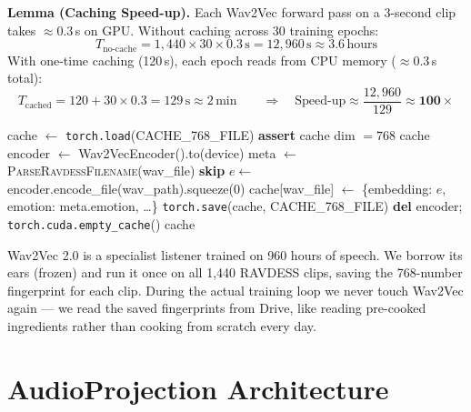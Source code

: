 \documentclass[12pt,a4paper]{article}
\theoremstyle{definition}
\theoremstyle{plain}
\theoremstyle{remark}
\begin{document}
\textbf{Lemma (Caching Speed-up).}
\label{lem:cache}
Each Wav2Vec forward pass on a 3-second clip takes $\approx 0.3$\,s on GPU.
Without caching across 30 training epochs:
\[
  T_{\text{no-cache}} = 1{,}440 \times 30 \times 0.3\,\text{s}
  = 12{,}960\,\text{s} \approx 3.6\,\text{hours}
\]
With one-time caching (120\,s), each epoch reads from CPU memory ($\approx 0.3$\,s total):
\[
  T_{\text{cached}} = 120 + 30 \times 0.3 = 129\,\text{s} \approx 2\,\text{min}
  \qquad \Rightarrow\quad \text{Speed-up} \approx \frac{12{,}960}{129} \approx \mathbf{100\times}
\]

\begin{algorithm}[H]
\caption{Extract and Cache RAVDESS Embeddings at 768d}
\label{alg:cache}
\begin{algorithmic}[1]
  \State cache $\gets$ \texttt{torch.load}(CACHE\_768\_FILE)
  \State \textbf{assert} cache dim $= 768$ 
  \State \Return cache 
\EndIf
\State encoder $\gets$ Wav2VecEncoder().to(device)
    \State meta $\gets$ \textsc{ParseRavdessFilename}(wav\_file)
     \textbf{skip} \EndIf
    \State $e \gets$ encoder.encode\_file(wav\_path).squeeze(0) 
    \State cache[wav\_file] $\gets$ \{embedding: $e$, emotion: meta.emotion, \ldots\}
  \EndFor
\EndFor
\State \texttt{torch.save}(cache, CACHE\_768\_FILE)
\State \textbf{del} encoder; \texttt{torch.cuda.empty\_cache}() 
\State \Return cache
\end{algorithmic}
\end{algorithm}

\begin{tcolorbox}[layman]
Wav2Vec 2.0 is a specialist listener trained on 960 hours of speech.
We borrow its ears (frozen) and run it once on all 1,440 RAVDESS clips,
saving the 768-number fingerprint for each clip.  During the actual training
loop we never touch Wav2Vec again --- we read the saved fingerprints from
Drive, like reading pre-cooked ingredients rather than cooking from scratch
every day.
\end{tcolorbox}

\section{AudioProjection Architecture}
\end{document}
